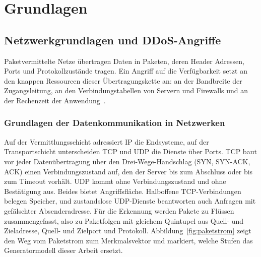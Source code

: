 \chapter{Grundlagen}
\label{chap:grundlagen}

\section{Netzwerkgrundlagen und DDoS-Angriffe}
\label{sec:netzwerk_ddos}
Paketvermittelte Netze übertragen Daten in Paketen, deren Header Adressen, Ports und Protokollzustände tragen. Ein Angriff auf die Verfügbarkeit setzt an den knappen Ressourcen dieser Übertragungskette an: an der Bandbreite der Zugangsleitung, an den Verbindungstabellen von Servern und Firewalls und an der Rechenzeit der Anwendung~\autocite{mirkovicTaxonomyDDoSAttack2004}.

\subsection{Grundlagen der Datenkommunikation in Netzwerken}
Auf der Vermittlungsschicht adressiert IP die Endsysteme, auf der Transportschicht unterscheiden TCP und UDP die Dienste über Ports. TCP baut vor jeder Datenübertragung über den Drei-Wege-Handschlag (SYN, SYN-ACK, ACK) einen Verbindungszustand auf, den der Server bis zum Abschluss oder bis zum Timeout vorhält. UDP kommt ohne Verbindungszustand und ohne Bestätigung aus. Beides bietet Angriffsfläche. Halboffene TCP-Verbindungen belegen Speicher, und zustandslose UDP-Dienste beantworten auch Anfragen mit gefälschter Absenderadresse. Für die Erkennung werden Pakete zu Flüssen zusammengefasst, also zu Paketfolgen mit gleichem Quintupel aus Quell- und Zieladresse, Quell- und Zielport und Protokoll. Abbildung~\ref{fig:paketstrom} zeigt den Weg vom Paketstrom zum Merkmalsvektor und markiert, welche Stufen das Generatormodell dieser Arbeit ersetzt.

